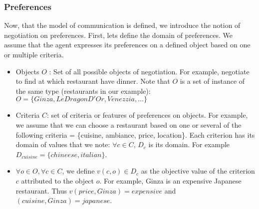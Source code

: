 \documentclass{llncs}
\begin{document}
\title{  \vskip -10pt}

\maketitle 


\subsubsection{Preferences}
\par Now, that  the model of communication is defined, we introduce the notion of negotiation on preferences. First, lets define the domain of preferences. We assume that the agent expresses its preferences on a defined object based on one or multiple criteria.   
 \begin{itemize}
 \item Objects $O$ : Set of all possible objects of negotiation. For example, negotiate to find at which restaurant have dinner. Note that $O$ is a set of instance of the same type (restaurants in our example):
  \\ $O=\{Ginza, LeDragonD'Or,  Venezzia, \ldots\}$
 \item Criteria $C$: set of criteria or features of preferences on objects. For example, we assume that we can choose a restaurant based on one or several of the following criteria = \{cuisine, ambiance, price, location\}. Each criterion has its domain of values that we note: $\forall c \in C$, $D_{c}$ is its domain. For example $D_{cuisine} = \{chineese, italian\}$.

 \item $\forall o \in O, \forall c \in C$, we define $v(c,o) \in D_{c}$ as the objective value of the criterion $c$ attributed to the object $o$. For example, Ginza is an expensive Japanese restaurant. Thus $v(price, Ginza) = expensive$ and $(cuisine, Ginza) = japanese$. 
 

\end{itemize}
\end{document}

